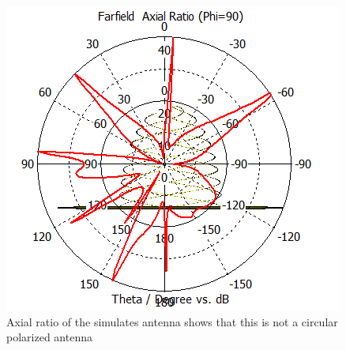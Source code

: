 \begin{figure}[H]
\centering 
\includegraphics[scale = 0.7]{figures/antennas/hemispherical/hemispherical_farfield3_AR}
\caption{Axial ratio of the simulates antenna shows that this is not a circular polarized antenna}
\label{fig:SHA_ff3_AR}
\end{figure} 












    



   